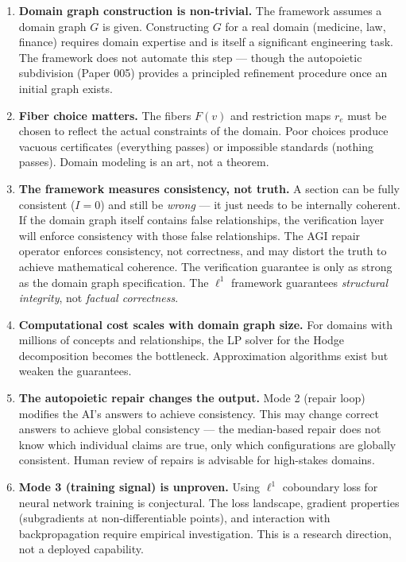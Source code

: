 \documentclass[
]{article}
\begin{document}
\begin{enumerate}
\def\labelenumi{\arabic{enumi}.}
\item
  \textbf{Domain graph construction is non-trivial.} The framework
  assumes a domain graph \(G\) is given. Constructing \(G\) for a real
  domain (medicine, law, finance) requires domain expertise and is
  itself a significant engineering task. The framework does not automate
  this step --- though the autopoietic subdivision (Paper 005) provides
  a principled refinement procedure once an initial graph exists.
\item
  \textbf{Fiber choice matters.} The fibers \(F(v)\) and restriction
  maps \(r_e\) must be chosen to reflect the actual constraints of the
  domain. Poor choices produce vacuous certificates (everything passes)
  or impossible standards (nothing passes). Domain modeling is an art,
  not a theorem.
\item
  \textbf{The framework measures consistency, not truth.} A section can
  be fully consistent (\(I = 0\)) and still be \emph{wrong} --- it just
  needs to be internally coherent. If the domain graph itself contains
  false relationships, the verification layer will enforce consistency
  with those false relationships. The AGI repair operator enforces
  consistency, not correctness, and may distort the truth to achieve
  mathematical coherence. The verification guarantee is only as strong
  as the domain graph specification. The \(\ell^1\) framework guarantees
  \emph{structural integrity}, not \emph{factual correctness}.
\item
  \textbf{Computational cost scales with domain graph size.} For domains
  with millions of concepts and relationships, the LP solver for the
  Hodge decomposition becomes the bottleneck. Approximation algorithms
  exist but weaken the guarantees.
\item
  \textbf{The autopoietic repair changes the output.} Mode 2 (repair
  loop) modifies the AI's answers to achieve consistency. This may
  change correct answers to achieve global consistency --- the
  median-based repair does not know which individual claims are true,
  only which configurations are globally consistent. Human review of
  repairs is advisable for high-stakes domains.
\item
  \textbf{Mode 3 (training signal) is unproven.} Using \(\ell^1\)
  coboundary loss for neural network training is conjectural. The loss
  landscape, gradient properties (subgradients at non-differentiable
  points), and interaction with backpropagation require empirical
  investigation. This is a research direction, not a deployed
  capability.
\end{enumerate}
\end{document}
